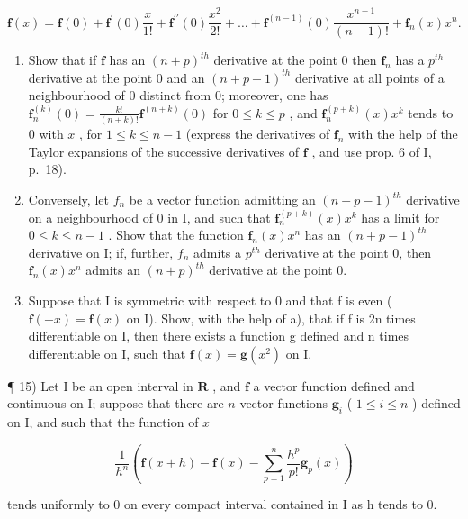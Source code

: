\[
\mathbf {f} (x) = \mathbf {f} (0) + \mathbf {f} ^ {\prime} (0) \frac {x}{1 !} + \mathbf {f} ^ {\prime \prime} (0) \frac {x ^ {2}}{2 !} + \dots + \mathbf {f} ^ {(n - 1)} (0) \frac {x ^ {n - 1}}{(n - 1) !} + \mathbf {f} _ {n} (x) x ^ {n}.
\]

\begin{enumerate}
\def\labelenumi{\alph{enumi})}
\item
  Show that if \(\mathbf{f}\) has an \((n + p)^{th}\) derivative at the point 0 then \(\mathbf{f}_n\) has a \(p^{th}\) derivative at the point 0 and an \((n + p - 1)^{th}\) derivative at all points of a neighbourhood of 0 distinct from 0; moreover, one has \(\mathbf{f}_n^{(k)}(0) = \frac{k!}{(n + k)!}\mathbf{f}^{(n + k)}(0)\) for \(0 \leqslant k \leqslant p\) , and \(\mathbf{f}_n^{(p + k)}(x)x^k\) tends to 0 with \(x\) , for \(1 \leqslant k \leqslant n - 1\) (express the derivatives of \(\mathbf{f}_n\) with the help of the Taylor expansions of the successive derivatives of \(\mathbf{f}\) , and use prop. 6 of I, p.~18).
\item
  Conversely, let \(f_{n}\) be a vector function admitting an \((n + p - 1)^{th}\) derivative on a neighbourhood of 0 in I, and such that \(\mathbf{f}_{n}^{(p+k)}(x)x^{k}\) has a limit for \(0 \leqslant k \leqslant n - 1\) . Show that the function \(\mathbf{f}_{n}(x)x^{n}\) has an \((n + p - 1)^{th}\) derivative on I; if, further, \(f_{n}\) admits a \(p^{th}\) derivative at the point 0, then \(\mathbf{f}_{n}(x)x^{n}\) admits an \((n + p)^{th}\) derivative at the point 0.
\item
  Suppose that I is symmetric with respect to 0 and that f is even ( \(\mathbf{f}(-x) = \mathbf{f}(x)\) on I). Show, with the help of a), that if f is 2n times differentiable on I, then there exists a function g defined and n times differentiable on I, such that \(\mathbf{f}(x) = \mathbf{g}(x^{2})\) on I.
\end{enumerate}

¶ 15) Let I be an open interval in \(\mathbf{R}\) , and \(\mathbf{f}\) a vector function defined and continuous on I; suppose that there are \(n\) vector functions \(\mathbf{g}_i\) ( \(1 \leqslant i \leqslant n\) ) defined on I, and such that the function of \(x\)

\[
\frac {1}{h ^ {n}} \left(\mathbf {f} (x + h) - \mathbf {f} (x) - \sum_ {p = 1} ^ {n} \frac {h ^ {p}}{p !} \mathbf {g} _ {p} (x)\right)
\]

tends uniformly to 0 on every compact interval contained in I as h tends to 0.

